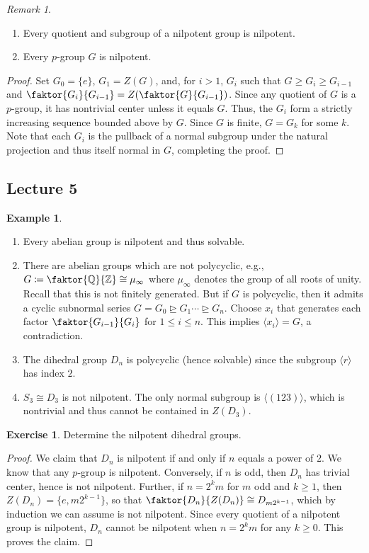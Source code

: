 \documentclass[10pt,letterpaper,cm]{nupset}
\theoremstyle{definition}
\newtheorem{exmp}[definition]{Example}
\theoremstyle{theorem}
\newtheorem{exercise}[definition]{Exercise}
\theoremstyle{remark}
\newtheorem{remark}[definition]{Remark}
\newcommand{\Q}{\mathbb Q}
\newcommand{\Z}{\mathbb Z}
\newcommand{\1}{\mathbf{1}}
\newcommand{\0}{\vec 0}
\begin{document}
\begin{remark} $ $
\begin{enumerate}
\item Every quotient and subgroup of a nilpotent group is nilpotent. 
\item Every $p$-group $G$ is nilpotent. 
\end{enumerate}
\end{remark}


\begin{proof}
Set $G_0 = \{e\}$, $G_1 = Z(G)$, and, for $i>1$, $G_{i}$ such that $G \geq G_i \geq G_{i-1}$ and $\faktor{G_i}{G_{i-1}} = Z(\faktor{G}{G_{i-1}})$. Since any quotient of $G$ is a $p$-group, it has nontrivial center unless it equals $G$.  Thus, the $G_i$ form a strictly increasing sequence bounded above by $G$. Since $G$ is finite, $G = G_k$ for some $k$. Note that each $G_i$ is the pullback of a normal subgroup under the natural projection and thus itself normal in $G$, completing the proof.
\end{proof}

\subsection{Lecture 5}

\begin{exmp}  $ $
\begin{enumerate}
\item Every abelian group is nilpotent and thus solvable. 
\item There are abelian groups which are not polycyclic, e.g., $G\coloneqq \faktor{\Q}{\Z} \cong \mu_{\infty}$ where $\mu_{\infty}$ denotes the group of all roots of unity. Recall that this is  not finitely generated.  But if $G$ is polycyclic, then it admits a cyclic subnormal series $G = G_0 \unrhd G_1 \cdots \unrhd G_n$. Choose $x_i$ that generates each factor $\faktor{G_{i-1}}{G_i}$ for $1\leq i \leq n$.  This implies $\langle x_i\rangle = G$, a contradiction. 
\item The dihedral group $D_n$ is polycyclic (hence solvable) since the subgroup $\langle r\rangle$ has index $2$.
\item $S_3\cong D_3$ is not nilpotent. The only normal subgroup is $\langle (1 2 3)\rangle$, which is nontrivial and thus cannot be contained in $Z(D_3)$.
\end{enumerate}
\end{exmp}

\begin{exercise}
Determine the nilpotent dihedral groups. 
\end{exercise}
\begin{proof}
We claim that $D_n$ is nilpotent  if and only if $n$ equals a power of $2$. We know that any $p$-group is nilpotent. Conversely, if $n$ is odd, then $D_n$ has trivial center, hence is not nilpotent. Further, if $n= 2^km$ for $m$ odd and $k\geq 1$, then $Z(D_n) = \{e, m2^{k-1}\}$, so that $\faktor{D_n}{Z(D_n)} \cong D_{m2^{k-1}}$, which by induction we can assume is not nilpotent. Since every quotient of a nilpotent group is nilpotent, $D_n$ cannot be nilpotent when $n = 2^km$ for any $k\geq 0$. This proves the claim.
\end{proof}
\end{document}
